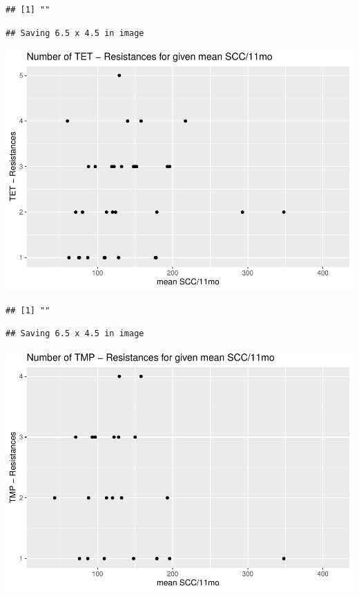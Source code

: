 \documentclass[
]{article}
\begin{document}
\begin{verbatim}
## [1] ""
\end{verbatim}

\begin{verbatim}
## Saving 6.5 x 4.5 in image
\end{verbatim}

\includegraphics{NResistenzen_files/figure-latex/numerical_variables-18.pdf}

\begin{verbatim}
## [1] ""
\end{verbatim}

\begin{verbatim}
## Saving 6.5 x 4.5 in image
\end{verbatim}

\includegraphics{NResistenzen_files/figure-latex/numerical_variables-19.pdf}
\end{document}
